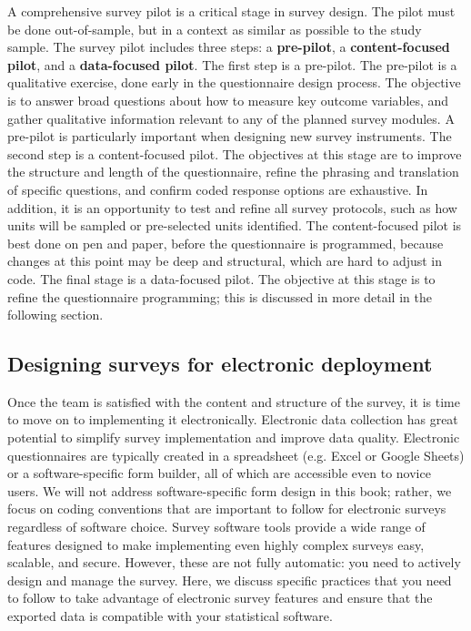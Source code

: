 A comprehensive survey pilot is a critical stage in survey design. 
The pilot must be done out-of-sample,
but in a context as similar as possible to the study sample.
The survey pilot includes three steps: 
a \textbf{pre-pilot}, a \textbf{content-focused pilot}, and a \textbf{data-focused pilot}. 
The first step is a pre-pilot. 
The pre-pilot is a qualitative exercise, done early in the questionnaire design process.
The objective is to answer broad questions about how to measure key outcome variables,
and gather qualitative information relevant to any of the planned survey modules.  
A pre-pilot is particularly important when designing new survey instruments.
The second step is a content-focused pilot.
The objectives at this stage are to improve the structure and length of the questionnaire,
refine the phrasing and translation of specific questions,
and confirm coded response options are exhaustive.
In addition, it is an opportunity to test and refine all survey protocols,
such as how units will be sampled or pre-selected units identified.
The content-focused pilot is best done on pen and paper, before the questionnaire is programmed,
because changes at this point may be deep and structural,
which are hard to adjust in code.
The final stage is a data-focused pilot.
The objective at this stage is to refine the questionnaire programming; this is discussed in more detail in the following section.


\subsection{Designing surveys for electronic deployment}
Once the team is satisfied with the content and structure of the survey,
it is time to move on to implementing it electronically.
Electronic data collection has great potential
to simplify survey implementation and improve data quality.
Electronic questionnaires are typically created
in a spreadsheet (e.g. Excel or Google Sheets)
or a software-specific form builder,
all of which are accessible even to novice users.
We will not address software-specific form design in this book;
rather, we focus on coding conventions that are important to follow
for electronic surveys regardless of software choice.
Survey software tools provide a wide range of features
designed to make implementing even highly complex surveys
easy, scalable, and secure.
However, these are not fully automatic:
you need to actively design and manage the survey.
Here, we discuss specific practices that you need to follow
to take advantage of electronic survey features
and ensure that the exported data
is compatible with your statistical software.

